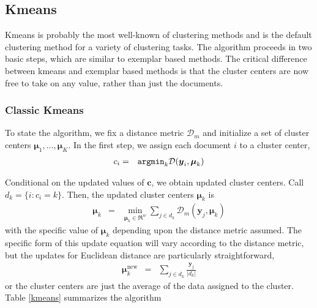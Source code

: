 \documentclass[11pt,letterpaper]{article}
\numberwithin{equation}{section}
\begin{document}
\subsection{Kmeans}
Kmeans is probably the most well-known of clustering methods and is
the default clustering method for a variety of clustering tasks. The
algorithm proceeds in two basic steps, which are similar to exemplar
based methods.  The critical difference between kmeans and exemplar
based methods is that the cluster centers are now free to take on
any value, rather than just the documents.
\subsubsection{Classic Kmeans}
To state the algorithm, we fix a distance metric $\mathcal{D}_m$ and
initialize a set of cluster centers $\boldsymbol{\mu}_{1},\hdots,
\boldsymbol{\mu}_K$.  In the first step, we assign each document $i$
to a cluster center,
\begin{eqnarray}
c_i & = & {\tt arg min}_k \mathcal{D}(\boldsymbol{y}_i,
\boldsymbol{\mu}_k ) \nonumber
\end{eqnarray}

Conditional on the updated values of $\boldsymbol{c}$, we obtain
updated cluster centers.  Call $d_k = \{i : c_i = k \}$.  Then, the
updated cluster centers $\boldsymbol{\mu}_k$ is
\begin{eqnarray}
\boldsymbol{\mu}_k & = & \min_{\boldsymbol{\mu}_k \in \Re^{w} }
\sum_{j \in d_k } \mathcal{D}_m (\boldsymbol{y}_j,
\boldsymbol{\mu}_k ) \nonumber
\end{eqnarray}
with the specific value of $\boldsymbol{\mu}_k$ depending upon the
distance metric assumed.  The specific form of this update equation
will vary according to the distance metric, but the updates for
Euclidean distance are particularly straightforward,
\begin{eqnarray}
\boldsymbol{\mu}^{\text{new}}_k & = & \sum_{j \in d_k}
\frac{\boldsymbol{y}_j}{|d_k|} \nonumber
\end{eqnarray}
or the cluster centers are just the average of the data assigned to
the cluster.  Table \ref{kmeans} summarizes the algorithm

\begin{table}[hbt!]
\caption{Kmeans algorithm} \label{kmeans} 
\end{table}
\end{document}

